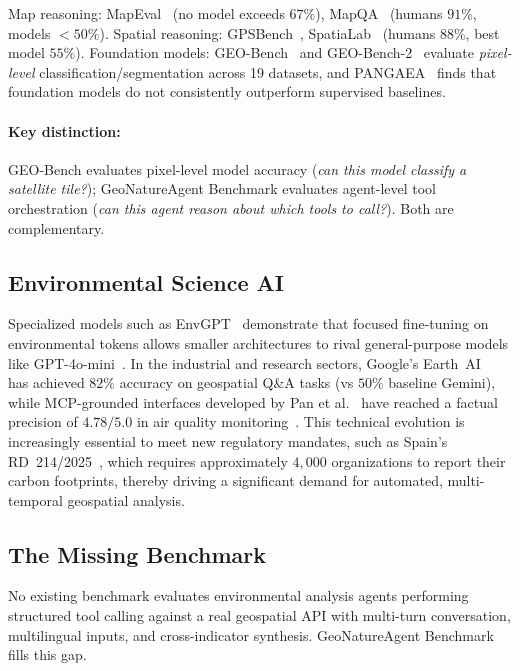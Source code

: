 \documentclass[sigconf]{acmart}
\begin{document}
Map reasoning: MapEval~\citep{dihan2025mapeval} (no model exceeds $67\%$), MapQA~\citep{arnold2025mapqa} (humans $91\%$, models $<50\%$). Spatial reasoning: GPSBench~\citep{truong2026gpsbench}, SpatiaLab~\citep{wasi2026spatialab} (humans $88\%$, best model $55\%$). Foundation models: GEO-Bench~\citep{lacoste2023geobench} and GEO-Bench-2~\citep{simumba2025geobench2} evaluate \emph{pixel-level} classification/segmentation across 19 datasets, and PANGAEA~\citep{marsocci2024pangaea} finds that foundation models do not consistently outperform supervised baselines.

\paragraph{Key distinction:}
GEO-Bench evaluates pixel-level model accuracy (\emph{can this model classify a satellite tile?}); GeoNatureAgent Benchmark evaluates agent-level tool orchestration (\emph{can this agent reason about which tools to call?}). Both are complementary.


\subsection{Environmental Science AI}

Specialized models such as EnvGPT~\citep{zhang2025envgpt} demonstrate that focused fine-tuning on environmental tokens allows smaller architectures to rival general-purpose models like GPT-4o-mini~\citep{zhang2025envgpt}. In the industrial and research sectors, Google’s Earth~AI~\citep{google2025earthai} has achieved $82\%$ accuracy on geospatial Q\&A tasks (vs $50\%$ baseline Gemini), while MCP-grounded interfaces developed by Pan et al.~\citep{pan2025mcpairquality} have reached a factual precision of $4.78/5.0$ in air quality monitoring~\citep{pan2025mcpairquality}. This technical evolution is increasingly essential to meet new regulatory mandates, such as Spain’s RD~214/2025~\citep{spain2025rd214}, which requires approximately $4,000$ organizations to report their carbon footprints, thereby driving a significant demand for automated, multi-temporal geospatial analysis.


\subsection{The Missing Benchmark}

No existing benchmark evaluates environmental analysis agents performing structured tool calling against a real geospatial API with multi-turn conversation, multilingual inputs, and cross-indicator synthesis. GeoNatureAgent Benchmark fills this gap.
\end{document}
